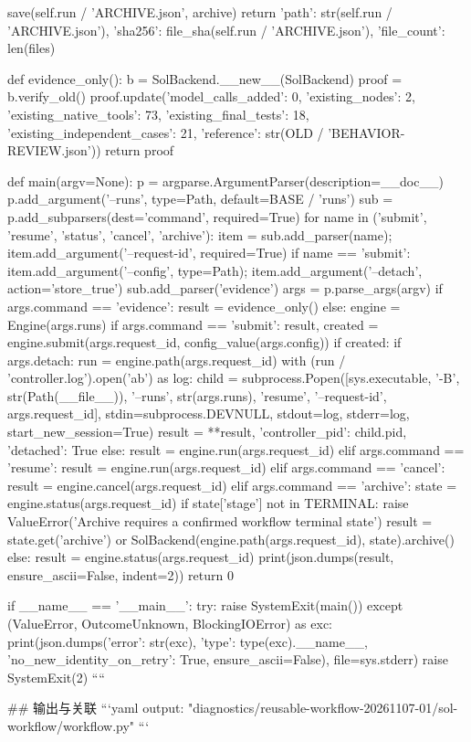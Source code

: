         save(self.run / 'ARCHIVE.json', archive)
        return {'path': str(self.run / 'ARCHIVE.json'), 'sha256': file_sha(self.run / 'ARCHIVE.json'), 'file_count': len(files)}


def evidence_only():
    b = SolBackend.__new__(SolBackend)
    proof = b.verify_old()
    proof.update({'model_calls_added': 0, 'existing_nodes': 2, 'existing_native_tools': 73,
                  'existing_final_tests': 18, 'existing_independent_cases': 21,
                  'reference': str(OLD / 'BEHAVIOR-REVIEW.json')})
    return proof


def main(argv=None):
    p = argparse.ArgumentParser(description=__doc__)
    p.add_argument('--runs', type=Path, default=BASE / 'runs')
    sub = p.add_subparsers(dest='command', required=True)
    for name in ('submit', 'resume', 'status', 'cancel', 'archive'):
        item = sub.add_parser(name); item.add_argument('--request-id', required=True)
        if name == 'submit':
            item.add_argument('--config', type=Path); item.add_argument('--detach', action='store_true')
    sub.add_parser('evidence')
    args = p.parse_args(argv)
    if args.command == 'evidence':
        result = evidence_only()
    else:
        engine = Engine(args.runs)
        if args.command == 'submit':
            result, created = engine.submit(args.request_id, config_value(args.config))
            if created:
                if args.detach:
                    run = engine.path(args.request_id)
                    with (run / 'controller.log').open('ab') as log:
                        child = subprocess.Popen([sys.executable, '-B', str(Path(__file__)), '--runs', str(args.runs),
                            'resume', '--request-id', args.request_id], stdin=subprocess.DEVNULL, stdout=log,
                            stderr=log, start_new_session=True)
                    result = {**result, 'controller_pid': child.pid, 'detached': True}
                else:
                    result = engine.run(args.request_id)
        elif args.command == 'resume':
            result = engine.run(args.request_id)
        elif args.command == 'cancel':
            result = engine.cancel(args.request_id)
        elif args.command == 'archive':
            state = engine.status(args.request_id)
            if state['stage'] not in TERMINAL:
                raise ValueError('Archive requires a confirmed workflow terminal state')
            result = state.get('archive') or SolBackend(engine.path(args.request_id), state).archive()
        else:
            result = engine.status(args.request_id)
    print(json.dumps(result, ensure_ascii=False, indent=2))
    return 0


if __name__ == '__main__':
    try:
        raise SystemExit(main())
    except (ValueError, OutcomeUnknown, BlockingIOError) as exc:
        print(json.dumps({'error': str(exc), 'type': type(exc).__name__, 'no_new_identity_on_retry': True}, ensure_ascii=False), file=sys.stderr)
        raise SystemExit(2)
````

## 输出与关联
```yaml
output: "diagnostics/reusable-workflow-20261107-01/sol-workflow/workflow.py"
```
